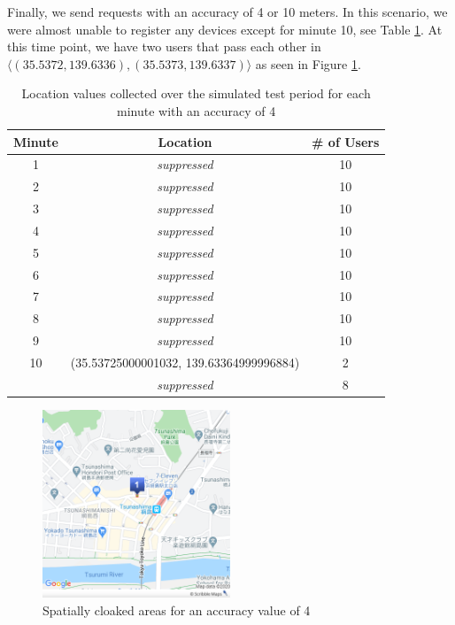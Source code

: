 Finally, we send requests with an accuracy of 4 or 10 meters. In this scenario, we were almost unable to register any devices except for minute 10, see Table \ref{tab:location_sim4}. At this time point, we have two users that pass each other in \(\langle(35.5372, 139.6336),(35.5373, 139.6337)\rangle\) as seen in Figure \ref{fig:acc4}.

\begin{table}[htbp]
    \centering
    \begin{tabular}{|c|c|c|} 
        \hline
        \textbf{Minute} & \textbf{Location} & \textbf{\# of Users}\\ [0.5ex] 
        \hline
        1 & \textit{suppressed} & 10 \\
        \hline
        2 &\textit{suppressed} & 10 \\
        \hline
        3 &\textit{suppressed} & 10 \\
        \hline
        4 &\textit{suppressed} & 10 \\
        \hline
        5 &\textit{suppressed} & 10 \\
        \hline
        6 &\textit{suppressed} & 10 \\
        \hline
        7 &\textit{suppressed} & 10 \\
        \hline
        8 &\textit{suppressed} & 10 \\
        \hline
        9 &\textit{suppressed} & 10 \\
        \hline
        10 & (35.53725000001032, 139.63364999996884) & 2 \\ 
        &\textit{suppressed} & 8 \\ 
        \hline
    \end{tabular}
    \caption{Location values collected over the simulated test period for each minute with an accuracy of 4}
    \label{tab:location_sim4}
\end{table}

\begin{figure}[htbp]
  \centering
  \includegraphics[width=0.5\textwidth]{figures/acc4}
  \caption{Spatially cloaked areas for an accuracy value of 4} \label{fig:acc4}
\end{figure}

